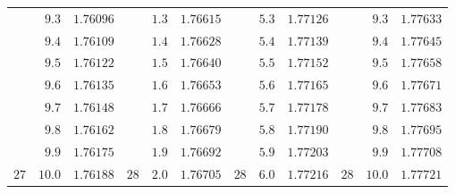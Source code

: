 \begin{center}
{{\begin{minipage}[t][500pt][t]{.96\linewidth}
{\begin{tabular}{rr|r||rr|r||rr|r||rr|r}
 & $9.3$ & $1.76096$ &  & $1.3$ & $1.76615$ &  & $5.3$ & $1.77126$ &  & $9.3$ & $1.77633$\\
 & $9.4$ & $1.76109$ &  & $1.4$ & $1.76628$ &  & $5.4$ & $1.77139$ &  & $9.4$ & $1.77645$\\
 & $9.5$ & $1.76122$ &  & $1.5$ & $1.76640$ &  & $5.5$ & $1.77152$ &  & $9.5$ & $1.77658$\\
 & $9.6$ & $1.76135$ &  & $1.6$ & $1.76653$ &  & $5.6$ & $1.77165$ &  & $9.6$ & $1.77671$\\
 & $9.7$ & $1.76148$ &  & $1.7$ & $1.76666$ &  & $5.7$ & $1.77178$ &  & $9.7$ & $1.77683$\\
 & $9.8$ & $1.76162$ &  & $1.8$ & $1.76679$ &  & $5.8$ & $1.77190$ &  & $9.8$ & $1.77695$\\
 & $9.9$ & $1.76175$ &  & $1.9$ & $1.76692$ &  & $5.9$ & $1.77203$ &  & $9.9$ & $1.77708$\\[4pt]
$27$ & $10.0$ & $1.76188$ & $28$ & $2.0$ & $1.76705$ & $28$ & $6.0$ & $1.77216$ & $28$ & $10.0$ & $1.77721$
\end{tabular}}
\end{minipage}}}\endgroup
\end{center}
\clearpage{}%
